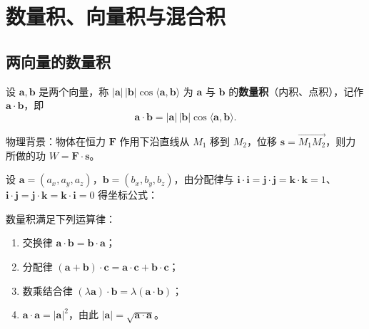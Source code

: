 
\section{数量积、向量积与混合积}

\subsection{两向量的数量积}

\begin{definition}
设 $\boldsymbol{a},\boldsymbol{b}$ 是两个向量，称 $|\boldsymbol{a}|\,|\boldsymbol{b}|\cos\langle\boldsymbol{a},\boldsymbol{b}\rangle$ 为 $\boldsymbol{a}$ 与 $\boldsymbol{b}$ 的\textbf{数量积}（内积、点积），记作 $\boldsymbol{a}\cdot\boldsymbol{b}$，即
\[
\boldsymbol{a}\cdot\boldsymbol{b}=|\boldsymbol{a}|\,|\boldsymbol{b}|\cos\langle\boldsymbol{a},\boldsymbol{b}\rangle .
\]
\end{definition}

物理背景：物体在恒力 $\boldsymbol{F}$ 作用下沿直线从 $M_1$ 移到 $M_2$，位移 $\boldsymbol{s}=\overrightarrow{M_1M_2}$，则力所做的功 $W=\boldsymbol{F}\cdot\boldsymbol{s}$。

设 $\boldsymbol{a}=(a_x,a_y,a_z)$，$\boldsymbol{b}=(b_x,b_y,b_z)$，由分配律与 $\boldsymbol{i}\cdot\boldsymbol{i}=\boldsymbol{j}\cdot\boldsymbol{j}=\boldsymbol{k}\cdot\boldsymbol{k}=1$、$\boldsymbol{i}\cdot\boldsymbol{j}=\boldsymbol{j}\cdot\boldsymbol{k}=\boldsymbol{k}\cdot\boldsymbol{i}=0$ 得坐标公式：


\begin{property}
数量积满足下列运算律：
\begin{enumerate}
\item 交换律 $\boldsymbol{a}\cdot\boldsymbol{b}=\boldsymbol{b}\cdot\boldsymbol{a}$；
\item 分配律 $(\boldsymbol{a}+\boldsymbol{b})\cdot\boldsymbol{c}=\boldsymbol{a}\cdot\boldsymbol{c}+\boldsymbol{b}\cdot\boldsymbol{c}$；
\item 数乘结合律 $(\lambda\boldsymbol{a})\cdot\boldsymbol{b}=\lambda(\boldsymbol{a}\cdot\boldsymbol{b})$；
\item $\boldsymbol{a}\cdot\boldsymbol{a}=|\boldsymbol{a}|^{2}$，由此 $|\boldsymbol{a}|=\sqrt{\boldsymbol{a}\cdot\boldsymbol{a}}$。
\end{enumerate}
\end{property}

